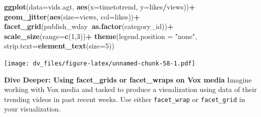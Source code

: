 \documentclass[]{article}
\newenvironment{Shaded}{\begin{snugshade}}{\end{snugshade}}
\newcommand{\DataTypeTok}[1]{\textcolor[rgb]{0.13,0.29,0.53}{#1}}
\newcommand{\DecValTok}[1]{\textcolor[rgb]{0.00,0.00,0.81}{#1}}
\newcommand{\KeywordTok}[1]{\textcolor[rgb]{0.13,0.29,0.53}{\textbf{#1}}}
\newcommand{\NormalTok}[1]{#1}
\newcommand{\OperatorTok}[1]{\textcolor[rgb]{0.81,0.36,0.00}{\textbf{#1}}}
\newcommand{\StringTok}[1]{\textcolor[rgb]{0.31,0.60,0.02}{#1}}
\begin{document}
\begin{Shaded}
\begin{Highlighting}[]
\KeywordTok{ggplot}\NormalTok{(}\DataTypeTok{data=}\NormalTok{vids.agt, }\KeywordTok{aes}\NormalTok{(}\DataTypeTok{x=}\NormalTok{timetotrend, }\DataTypeTok{y=}\NormalTok{likes}\OperatorTok{/}\NormalTok{views))}\OperatorTok{+}
\StringTok{  }\KeywordTok{geom_jitter}\NormalTok{(}\KeywordTok{aes}\NormalTok{(}\DataTypeTok{size=}\NormalTok{views, }\DataTypeTok{col=}\NormalTok{likes))}\OperatorTok{+}
\StringTok{  }\KeywordTok{facet_grid}\NormalTok{(publish_wday}\OperatorTok{~}\KeywordTok{as.factor}\NormalTok{(category_id))}\OperatorTok{+}
\StringTok{  }\KeywordTok{scale_size}\NormalTok{(}\DataTypeTok{range=}\KeywordTok{c}\NormalTok{(}\DecValTok{1}\NormalTok{,}\DecValTok{3}\NormalTok{))}\OperatorTok{+}
\StringTok{  }\KeywordTok{theme}\NormalTok{(}\DataTypeTok{legend.position =} \StringTok{"none"}\NormalTok{, }
        \DataTypeTok{strip.text=}\KeywordTok{element_text}\NormalTok{(}\DataTypeTok{size=}\DecValTok{5}\NormalTok{))}
\end{Highlighting}
\end{Shaded}

\texttt{[image: dv\_files/figure-latex/unnamed-chunk-58-1.pdf]}

\textbf{Dive Deeper: Using facet\_grids or facet\_wraps on Vox media}
Imagine working with Vox media and tasked to produce a visualization
using data of their trending videos in past recent weeks. Use either
\texttt{facet\_wrap} or \texttt{facet\_grid} in your visualization.

\begin{Shaded}
\end{Shaded}
\end{document}
